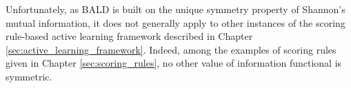 Unfortunately, as BALD is built on the unique symmetry property of Shannon's mutual information, it does not generally apply to other instances of the scoring rule-based active learning framework described in Chapter \ref{sec:active_learning_framework}. Indeed, among the examples of scoring rules given in Chapter \ref{sec:scoring_rules}, no other value of information functional is symmetric.